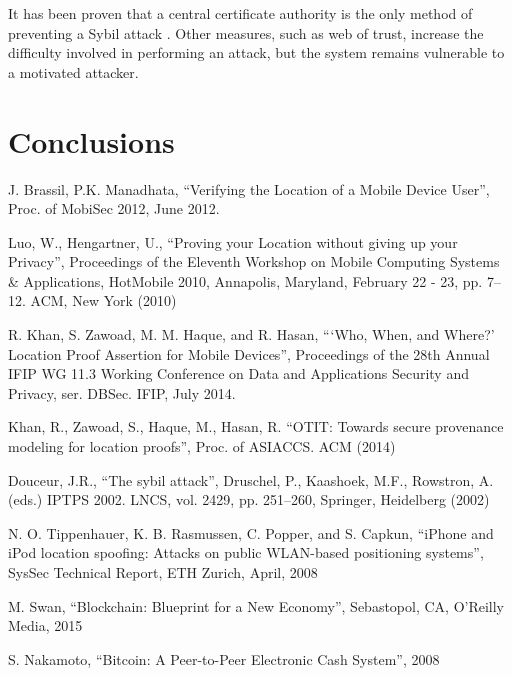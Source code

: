 \documentclass[12pt]{article}
\begin{document}
It has been proven that a central certificate authority is the only method of preventing a Sybil attack \cite{sybil}. Other measures, such as web of trust, increase the difficulty involved in performing an attack, but the system remains vulnerable to a motivated attacker.

\section{Conclusions}

\begin{thebibliography}{9}

  J. Brassil, P.K. Manadhata,
  ``Verifying the Location of a Mobile Device User'',
  Proc. of MobiSec 2012,
  June 2012.

  Luo, W., Hengartner, U.,
  ``Proving your Location without giving up your Privacy'',
  Proceedings of the Eleventh Workshop on Mobile Computing Systems \& Applications,
  HotMobile 2010, Annapolis, Maryland, February 22 - 23, pp. 7–12. ACM,
  New York (2010)

  R. Khan, S. Zawoad, M. M. Haque, and R. Hasan,
  ```Who, When, and Where?' Location Proof Assertion for Mobile Devices'',
  Proceedings of the 28th Annual IFIP WG 11.3 Working Conference on Data and Applications Security and Privacy, ser. DBSec. IFIP,
  July 2014.
 
  Khan, R., Zawoad, S., Haque, M., Hasan, R.
  ``OTIT: Towards secure provenance modeling for location proofs'',
  Proc. of ASIACCS. ACM (2014)

  Douceur, J.R.,
  ``The sybil attack'',
  Druschel, P., Kaashoek, M.F., Rowstron, A. (eds.) IPTPS 2002. LNCS, vol. 2429, pp. 251–260,
  Springer, Heidelberg (2002)

  N. O. Tippenhauer, K. B. Rasmussen, C. Popper, and S. Capkun,
  ``iPhone and iPod location spoofing: Attacks on public WLAN-based positioning systems'',
  SysSec Technical Report,
  ETH Zurich, April, 2008

  M. Swan,
  ``Blockchain: Blueprint for a New Economy'',
  Sebastopol, CA,
  O’Reilly Media, 2015

  S. Nakamoto,
  ``Bitcoin: A Peer-to-Peer Electronic Cash System'',
  2008

\end{thebibliography}
\end{document}
